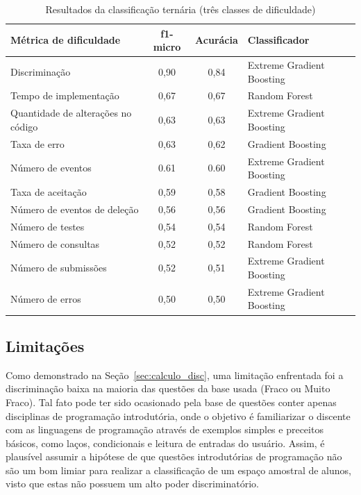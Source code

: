 \documentclass[12pt]{article}
\begin{document}
\begin{table}[h!]
    \centering
    \small
    \caption{Resultados da classificação ternária (três classes de dificuldade)}
    \label{tab:tabela_class_ternaria}
    \begin{tabular}{lccl}
        \toprule
        \textbf{Métrica de dificuldade} & \textbf{f1-micro} & \textbf{Acurácia} & \textbf{Classificador} \\
        \midrule
        Discriminação        & 0,90 & 0,84 & Extreme Gradient Boosting \\
        Tempo de implementação & 0,67 & 0,67 & Random Forest \\
        Quantidade de alterações no código & 0,63 & 0,63 & Extreme Gradient Boosting \\
        Taxa de erro       & 0,63 & 0,62 & Gradient Boosting \\
        Número de eventos         & 0.61 & 0.60 & Extreme Gradient Boosting \\
        Taxa de aceitação      & 0,59 & 0,58 & Gradient Boosting \\
        Número de eventos de deleção    & 0,56 & 0,56 & Gradient Boosting \\
        Número de testes          & 0,54 & 0,54 & Random Forest \\
        Número de consultas       & 0,52 & 0,52 & Random Forest \\
        Número de submissões      & 0,52 & 0,51 & Extreme Gradient Boosting \\
        Número de erros           & 0,50 & 0,50 & Extreme Gradient Boosting \\
        \bottomrule
    \end{tabular}
\end{table}

\subsection{Limitações}

Como demonstrado na Seção~\ref{sec:calculo_disc}, uma limitação enfrentada foi a discriminação baixa na maioria das questões da base usada (Fraco ou Muito Fraco). Tal fato pode ter sido ocasionado pela base de questões conter apenas disciplinas de programação introdutória, onde o objetivo é familiarizar o discente com as linguagens de programação através de exemplos simples e preceitos básicos, como laços, condicionais e leitura de entradas do usuário. Assim, é plausível assumir a hipótese de que questões introdutórias de programação não são um bom limiar para realizar a classificação de um espaço amostral de alunos, visto que estas não possuem um alto poder discriminatório. %
\end{document}
